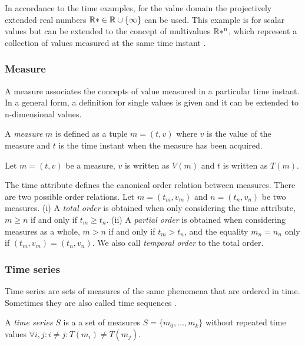 In accordance to the time examples, for the value domain the
projectively extended real numbers $\mathbb{R}* \in \mathbb{R} \cup \{\infty\}$ can be
used.  This example is for scalar values but can be extended to the
concept of multivalues $\mathbb{R}*^n$, which represent a collection of values
measured at the same time instant \cite{assfalg08:thesis}.




\subsubsection{Measure}

A measure associates the concepts of value measured in a particular
time instant.  In a general form, a definition for single values is
given and it can be extended to n-dimensional values.

\begin{definition}
  A \emph{measure} $m$ is defined as a tuple $m=(t,v)$ where $v$ is the
  value of the measure and $t$ is the time instant when the measure
  has been acquired.
\end{definition}

Let $m = (t,v)$ be a measure, $v$ is written as $V(m)$ and $t$ is
written as $T(m)$.

The time attribute defines the canonical order relation between
measures. There are two possible order relations. Let $m = (t_m, v_m)$
and $n = (t_n, v_n)$ be two measures.  (i) A \emph{total order} is
obtained when only considering the time attribute, $m\geq n$ if and
only if $t_m\geq t_n$.  (ii) A \emph{partial order} is obtained when
considering measures as a whole, $m > n$ if and only if $t_m > t_n$,
and the equality $m_n = n_n$ only if $(t_m, v_m) = (t_n, v_n)$.  We
also call \emph{temporal order} to the total order.



\subsubsection{Time series}

Time series are sets of measures of the same phenomena that are
ordered in time.  Sometimes they are also called time sequences
\cite{last:hetland}.


\begin{definition}
  A \emph{time series} $S$ is a a set of measures $S = \{m_0, \ldots,
  m_k\}$ without repeated time values $\forall i,j:i\neq j: T(m_i)\neq
  T(m_j)$.
\end{definition}

